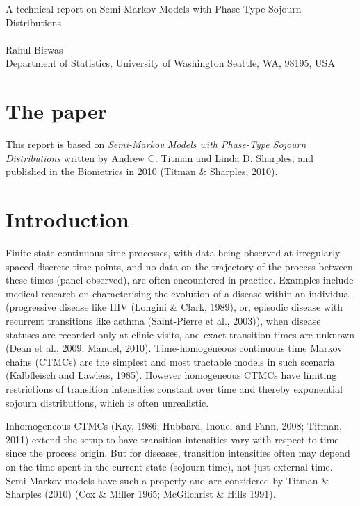 \documentclass{uwstat572}
\begin{document}

\begin{center}
  {\LARGE A technical report on Semi-Markov Models with Phase-Type Sojourn Distributions}\\\ \\
  {Rahul Biswas \\ 
    Department of Statistics, University of Washington Seattle, WA, 98195, USA
  }
\end{center}
\nocite{*}
\section*{The paper}
This report is based on \textit{Semi-Markov Models with Phase-Type Sojourn Distributions} written by Andrew C. Titman and Linda D. Sharples, and published in the Biometrics in 2010 (Titman \& Sharples; 2010).

\section{Introduction}

Finite state continuous-time processes, with data being observed at irregularly spaced discrete time points, and no data on the trajectory of the process between these times (panel observed), are often encountered in practice. Examples include medical research on characterising the evolution of a disease within an individual (progressive disease like HIV (Longini \& Clark, 1989), or, episodic disease with recurrent transitions like asthma (Saint-Pierre et al., 2003)), when disease statuses are recorded only at clinic visits, and exact transition times are unknown (Dean et al., 2009; Mandel, 2010).
Time-homogeneous continuous time Markov chains (CTMCs) are the simplest and most tractable models in such scenaria (Kalbfleisch and Lawless, 1985). However homogeneous CTMCs have limiting restrictions of transition intensities constant over time and thereby exponential sojourn distributions, which is often unrealistic.

Inhomogeneous CTMCs (Kay, 1986; Hubbard, Inoue, and Fann, 2008; Titman, 2011) extend the setup to have transition intensities vary with respect to time since the process origin. But for diseases, transition intensities often may depend on the time spent in the current state (sojourn time), not just external time. Semi-Markov models have such a property and are considered by Titman \& Sharples (2010) (Cox \& Miller 1965; McGilchrist \& Hills 1991).
\end{document}
